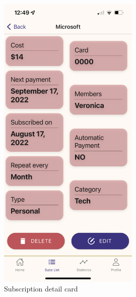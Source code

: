 \documentclass[11pt]{article}
\begin{document}
\begin{figure}[h!]
\begin{minipage}[c]{0.45\textwidth}
        \includegraphics[width=0.6\textwidth, clip]{../../assets/smartphone/detail.PNG}
        \caption{Subscription detail card}
        \label{fig:detail}
    \end{minipage}
\end{figure}
\end{document}
